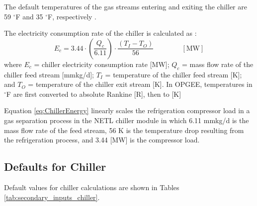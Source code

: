 \documentclass[11pt]{report}
\newcommand{\eqnunit}[1]{\quad\quad \scriptstyle{\left[\text{#1}\right]}}
\begin{document}
The default temperatures of the gas streams entering and exiting the chiller are 59 $^{\circ}${F} and 35 $^{\circ}${F}, respectively \cite{NETLChillerModel}.

The electricity consumption rate of the chiller is calculated as \cite{NETLChillerModel}:
\begin{equation} \label{eq:ChillerEnergy}
E_{c}=3.44\cdot\left(\frac{Q_{c}}{6.11}\right)\cdot\frac{\left(T_{I}-T_{O}\right)}{56} \quad \quad \eqnunit{MW}
\end{equation}
where $E_{c}$ = chiller electricity consumption rate [MW]; $Q_{c}$ = mass flow rate of the chiller feed stream [mmkg/d]; $T_{I}$ = temperature of the chiller feed stream [{K}]; and $T_{O}$ = temperature of the chiller exit stream [{K}]. In OPGEE, temperatures in $^\circ$F are first converted to absolute Rankine [R], then to [K]

Equation \ref{eq:ChillerEnergy} linearly scales the refrigeration compressor load in a gas separation process in the NETL chiller module \cite{NETLChillerModel} in which 6.11 mmkg/d is the mass flow rate of the feed stream, 56 {K} is the temperature drop resulting from the refrigeration process, and 3.44 [MW] is the compressor load.


\subsection{Defaults for Chiller}

Default values for chiller calculations are shown in Tables \ref{tab:secondary_inputs_chiller}.

\end{document}
